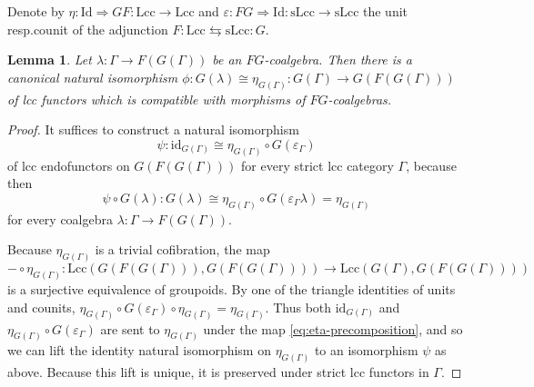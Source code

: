 \documentclass[a4paper]{article}
\newtheorem{lemma}[theorem]{Lemma}
\theoremstyle{remark}
\theoremstyle{definition}
\begin{document}
Denote by $\eta : \mathrm{Id} \Rightarrow G F : \mathrm{Lcc} \rightarrow \mathrm{Lcc}$ and $\varepsilon : F G \Rightarrow \mathrm{Id} : \mathrm{sLcc} \rightarrow \mathrm{sLcc}$ the unit resp.\@ counit of the adjunction $F : \mathrm{Lcc} \leftrightarrows \mathrm{sLcc} : G$.
\begin{lemma}
  \label{lem:coalgebra-vs-eta}
  Let $\lambda : \Gamma \rightarrow F(G(\Gamma))$ be an $FG$-coalgebra.
  Then there is a canonical natural isomorphism $\phi : G(\lambda) \cong \eta_{G(\Gamma)} : G(\Gamma) \rightarrow G(F(G(\Gamma)))$ of lcc functors which is compatible with morphisms of $FG$-coalgebras.
\end{lemma}
\begin{proof}
  It suffices to construct a natural isomorphism
  \begin{equation}
    \psi : \mathrm{id}_{G(\Gamma)} \cong \eta_{G(\Gamma)} \circ G(\varepsilon_\Gamma)
  \end{equation}
  of lcc endofunctors on $G(F(G(\Gamma)))$ for every strict lcc category $\Gamma$, because then
  \begin{equation}
    \psi \circ G(\lambda) : G(\lambda) \cong \eta_{G(\Gamma)} \circ G(\varepsilon_\Gamma \lambda) = \eta_{G(\Gamma)}
  \end{equation}
  for every coalgebra $\lambda : \Gamma \rightarrow F(G(\Gamma))$.

  Because $\eta_{G(\Gamma)}$ is a trivial cofibration, the map
  \begin{equation}
    \label{eq:eta-precomposition}
    - \circ \eta_{G(\Gamma)} : \mathrm{Lcc}(G(F(G(\Gamma))), G(F(G(\Gamma)))) \rightarrow \mathrm{Lcc}(G(\Gamma), G(F(G(\Gamma)))) 
  \end{equation}
  is a surjective equivalence of groupoids.
  By one of the triangle identities of units and counits, $\eta_{G(\Gamma)} \circ G(\varepsilon_\Gamma) \circ \eta_{G(\Gamma)} = \eta_{G(\Gamma)}$.
  Thus both $\mathrm{id}_{G(\Gamma)}$ and $\eta_{G(\Gamma)} \circ G(\varepsilon_\Gamma)$ are sent to $\eta_{G(\Gamma)}$ under the map \eqref{eq:eta-precomposition}, and so we can lift the identity natural isomorphism on $\eta_{G(\Gamma)}$ to an isomorphism $\psi$ as above.
  Because this lift is unique, it is preserved under strict lcc functors in $\Gamma$.
\end{proof}
\end{document}
